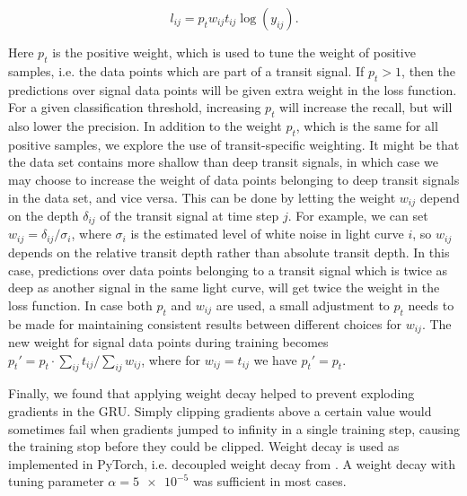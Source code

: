 \begin{equation}
    l_{ij} = p_t w_{ij} t_{ij} \log( y_{ij} ).
\end{equation}

Here $p_t$ is the positive weight, which is used to tune the weight of positive samples, i.e. the data points which are part of a transit signal. If $p_t > 1$, then the predictions over signal data points will be given extra weight in the loss function. For a given classification threshold, increasing $p_t$ will increase the recall, but will also lower the precision. In addition to the weight $p_t$, which is the same for all positive samples, we explore the use of transit-specific weighting. It might be that the data set contains more shallow than deep transit signals, in which case we may choose to increase the weight of data points belonging to deep transit signals in the data set, and vice versa. This can be done by letting the weight $w_{ij}$ depend on the depth $\delta_{ij}$ of the transit signal at time step $j$. For example, we can set $w_{ij} = \delta_{ij} / \sigma_{i}$, where $\sigma_i$ is the estimated level of white noise in light curve $i$, so $w_{ij}$ depends on the relative transit depth rather than absolute transit depth. In this case, predictions over data points belonging to a transit signal which is twice as deep as another signal in the same light curve, will get twice the weight in the loss function. In case both $p_t$ and $w_{ij}$ are used, a small adjustment to $p_t$ needs to be made for maintaining consistent results between different choices for $w_{ij}$. The new weight for signal data points during training becomes  $p_t' = p_t \cdot \sum_{ij} t_{ij} / \sum_{ij} w_{ij}$, where for $w_{ij} = t_{ij}$ we have $p_t' = p_t$.

Finally, we found that applying weight decay helped to prevent exploding gradients in the GRU. Simply clipping gradients above a certain value would sometimes fail when gradients jumped to infinity in a single training step, causing the training stop before they could be clipped. Weight decay is used as implemented in PyTorch, i.e. decoupled weight decay from \cite{loshchilov2017decoupled}. A weight decay with tuning parameter $\alpha=\num{5e-5}$ was sufficient in most cases.


